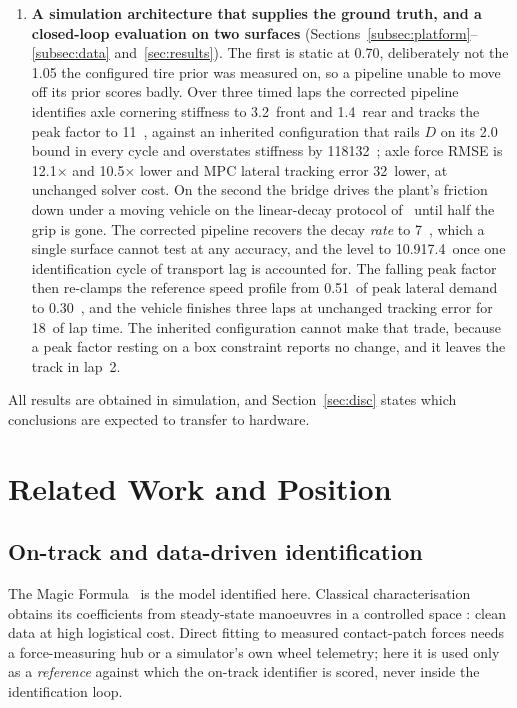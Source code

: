 \documentclass[lineno,12pt]{sn-jnl}
\makeatletter
\newif\ifsiu@prev
\DeclareRobustCommand{\siu@sep}{\ifsiu@prev\,\fi}
\DeclareRobustCommand{\siu@unit}[1]{\siu@sep\text{#1}\siu@prevtrue}
\DeclareRobustCommand{\siu@pre}[1]{\siu@sep\text{#1}\siu@prevfalse}
\DeclareRobustCommand{\siu@div}[1]{\text{#1}\siu@prevfalse}
\DeclareRobustCommand{\meter}{m}
\DeclareRobustCommand{\second}{s}
\DeclareRobustCommand{\gram}{g}
\DeclareRobustCommand{\newton}{N}
\DeclareRobustCommand{\radian}{rad}
\DeclareRobustCommand{\hertz}{Hz}
\DeclareRobustCommand{\percent}{\%}
\DeclareRobustCommand{\g}{\textit{g}}
\DeclareRobustCommand{\kilo}{k}
\DeclareRobustCommand{\milli}{m}
\DeclareRobustCommand{\per}{/}
\DeclareRobustCommand{\squared}{\ensuremath{^{2}}}
\providecommand{\degree}{\ensuremath{^{\circ}}}
\DeclareRobustCommand{\si}[1]{\begingroup
  \siu@prevfalse
  \renewcommand{\meter}{\siu@unit{m}}%
  \renewcommand{\second}{\siu@unit{s}}%
  \renewcommand{\gram}{\siu@unit{g}}%
  \renewcommand{\newton}{\siu@unit{N}}%
  \renewcommand{\radian}{\siu@unit{rad}}%
  \renewcommand{\hertz}{\siu@unit{Hz}}%
  \renewcommand{\percent}{\siu@unit{\%}}%
  \renewcommand{\degree}{\siu@unit{\ensuremath{^{\circ}}}}%
  \renewcommand{\g}{\siu@unit{\textit{g}}}%
  \renewcommand{\kilo}{\siu@pre{k}}%
  \renewcommand{\milli}{\siu@pre{m}}%
  \renewcommand{\per}{\siu@div{/}}%
  \renewcommand{\squared}{\ensuremath{^{2}}}%
  #1\endgroup}
\DeclareRobustCommand{\num}[1]{#1}
\DeclareRobustCommand{\SI}[2]{#1\,\si{#2}}
\DeclareRobustCommand{\SIrange}[3]{#1\text{--}#2\,\si{#3}}
\theoremstyle{thmstyleone}%
\theoremstyle{thmstyletwo}%
\theoremstyle{thmstylethree}%
\makeatother
\begin{document}
\begin{enumerate}
\item \textbf{A simulation architecture that supplies the ground truth, and a
closed-loop evaluation on two surfaces}
(Sections~\ref{subsec:platform}--\ref{subsec:data} and~\ref{sec:results}). The
first is static at \num{0.70}, deliberately not the \num{1.05} the configured
tire prior was measured on, so a pipeline unable to move off its prior scores
badly. Over three timed laps the corrected pipeline identifies axle cornering
stiffness to \SI{3.2}{\percent} front and \SI{1.4}{\percent} rear and tracks
the peak factor to \SI{11}{\percent}, against an inherited configuration that
rails $D$ on its \num{2.0} bound in every cycle and overstates stiffness by
\SIrange{118}{132}{\percent}; axle force RMSE is \num{12.1}$\times$ and
\num{10.5}$\times$ lower and MPC lateral tracking error \SI{32}{\percent}
lower, at unchanged solver cost. On the second the bridge drives the plant's
friction down under a moving vehicle on the linear-decay protocol
of~\cite{llampc2025} until half the grip is gone. The corrected pipeline
recovers the decay \emph{rate} to \SI{7}{\percent}, which a single surface
cannot test at any accuracy, and the level to
\SIrange{10.9}{17.4}{\percent} once one identification cycle of transport lag is
accounted for. The falling peak factor then re-clamps the reference speed
profile from \SI{0.51}{\g} of peak lateral demand to \SI{0.30}{\g}, and the
vehicle finishes three laps at unchanged tracking error for \SI{18}{\percent}
of lap time. The inherited configuration cannot make that trade, because a peak
factor resting on a box constraint reports no change, and it leaves the track in
lap~2.
\end{enumerate}

All results are obtained in simulation, and Section~\ref{sec:disc} states which
conclusions are expected to transfer to hardware.

\section{Related Work and Position}
\label{sec:related}

\subsection{On-track and data-driven identification}

The Magic Formula~\cite{pacejka1987sae,pacejka2012book} is the model identified
here. Classical characterisation obtains its coefficients from steady-state
manoeuvres in a controlled space \cite{ontrack2025,amz2020}: clean data at high
logistical cost. Direct fitting to measured contact-patch forces needs a
force-measuring hub or a simulator's own wheel telemetry; here it is used only
as a \emph{reference} against which the on-track identifier is scored, never
inside the identification loop.
\end{document}
